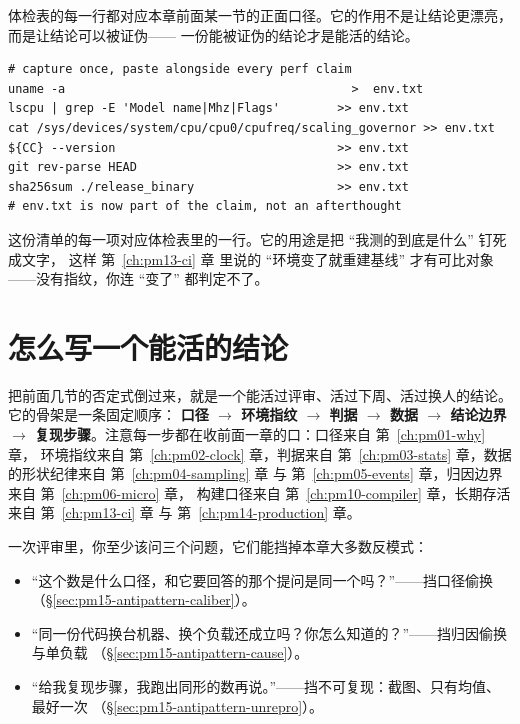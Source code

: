 \documentclass[12pt,a4paper,fontset=fandol]{ctexbook}
\begin{document}
体检表的每一行都对应本章前面某一节的正面口径。它的作用不是让结论更漂亮，而是让结论可以被证伪——
一份能被证伪的结论才是能活的结论。

\begin{lstlisting}[style=shellstyle, caption={可复现结论的最小环境指纹采集骨架（不含实测值，读者在发布机上运行）}, label={lst:pm15-fingerprint}]
# capture once, paste alongside every perf claim
uname -a                                        >  env.txt
lscpu | grep -E 'Model name|Mhz|Flags'        >> env.txt
cat /sys/devices/system/cpu/cpu0/cpufreq/scaling_governor >> env.txt
${CC} --version                               >> env.txt
git rev-parse HEAD                            >> env.txt
sha256sum ./release_binary                    >> env.txt
# env.txt is now part of the claim, not an afterthought
\end{lstlisting}

这份清单的每一项对应体检表里的一行。它的用途是把 ``我测的到底是什么'' 钉死成文字，
这样 第~\ref{ch:pm13-ci} 章 里说的 ``环境变了就重建基线'' 才有可比对象——没有指纹，你连 ``变了''
都判定不了。

\section{怎么写一个能活的结论}

把前面几节的否定式倒过来，就是一个能活过评审、活过下周、活过换人的结论。它的骨架是一条固定顺序：
\textbf{口径 $\rightarrow$ 环境指纹 $\rightarrow$ 判据 $\rightarrow$ 数据 $\rightarrow$
结论边界 $\rightarrow$ 复现步骤}。注意每一步都在收前面一章的口：口径来自 第~\ref{ch:pm01-why} 章，
环境指纹来自 第~\ref{ch:pm02-clock} 章，判据来自 第~\ref{ch:pm03-stats} 章，数据的形状纪律来自
第~\ref{ch:pm04-sampling} 章 与 第~\ref{ch:pm05-events} 章，归因边界来自 第~\ref{ch:pm06-micro} 章，
构建口径来自 第~\ref{ch:pm10-compiler} 章，长期存活来自 第~\ref{ch:pm13-ci} 章 与 第~\ref{ch:pm14-production} 章。

一次评审里，你至少该问三个问题，它们能挡掉本章大多数反模式：

\begin{itemize}
  \item ``这个数是什么口径，和它要回答的那个提问是同一个吗？''——挡口径偷换（\S\ref{sec:pm15-antipattern-caliber}）。
  \item ``同一份代码换台机器、换个负载还成立吗？你怎么知道的？''——挡归因偷换与单负载
        （\S\ref{sec:pm15-antipattern-cause}）。
  \item ``给我复现步骤，我跑出同形的数再说。''——挡不可复现：截图、只有均值、最好一次
        （\S\ref{sec:pm15-antipattern-unrepro}）。
\end{itemize}
\end{document}
